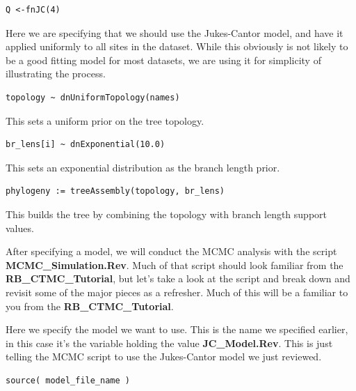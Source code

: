 {\tt \begin{snugshade*}
\begin{lstlisting}
Q <-fnJC(4)
\end{lstlisting}
\end{snugshade*}}

Here we are specifying that we should use the Jukes-Cantor model, and have it applied uniformly to all sites in 
the dataset. While this obviously is not likely to be a good fitting model for most datasets, we are using it for 
simplicity of illustrating the process. 

{\tt \begin{snugshade*}
\begin{lstlisting}
topology ~ dnUniformTopology(names)
\end{lstlisting}
\end{snugshade*}}
This sets a uniform prior on the tree topology.
{\tt \begin{snugshade*}
\begin{lstlisting}
br_lens[i] ~ dnExponential(10.0)
\end{lstlisting}
\end{snugshade*}}
This sets an exponential distribution as the branch length prior.
{\tt \begin{snugshade*}
\begin{lstlisting}
phylogeny := treeAssembly(topology, br_lens)
\end{lstlisting}
\end{snugshade*}}
This builds the tree by combining the topology with branch length support values.

After specifying a model, we will conduct the MCMC analysis with the script  \textbf{MCMC\_Simulation.Rev}. 
Much of that script should look familiar from the \textbf{RB\_CTMC\_Tutorial}, but let's take a look at 
the script and break down and revisit some of the major pieces as a refresher. Much of this will be a 
familiar to you from the \textbf{RB\_CTMC\_Tutorial}. 

Here we specify the model we want to use. This is the name we specified earlier, in this case it's the 
variable holding the value \textbf{JC\_Model.Rev}. This is just telling the MCMC script to use the
Jukes-Cantor model we just reviewed. 

{\tt \begin{snugshade*}
\begin{lstlisting}
source( model_file_name )
\end{lstlisting}
\end{snugshade*}}

